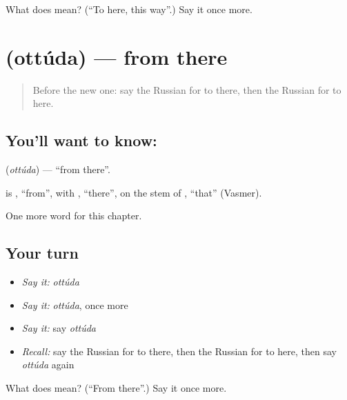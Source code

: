 \begin{tcolorbox}[breakable,colback=teal!4,colframe=teal!35!black,title={Before you move on}]
What does  mean? (\textquotedblleft{}To here, this way\textquotedblright{}.) Say it once more.
\end{tcolorbox}
\section[\texorpdfstring{\ru{оттуда} (ottúda)}{оттуда (ottúda)}]{ (ottúda) — from there}

\label{lesson:RU-C184-ottuda}



\begin{quote}
Before the new one: say the Russian for to there, then the Russian for to here.
\end{quote}

\subsection*{You'll want to know: }
\textbf{} (\emph{ottúda}) — \textquotedblleft{}from there\textquotedblright{}.

\begin{cousinweb}
\textbf{} is \emph{}, \textquotedblleft{}from\textquotedblright{}, with \emph{}, \textquotedblleft{}there\textquotedblright{}, on the stem of \emph{}, \textquotedblleft{}that\textquotedblright{} (Vasmer).
\end{cousinweb}

\begin{grammarlens}[title={What you've built}]
One more word for this chapter.
\end{grammarlens}

\subsection*{Your turn}
\begin{itemize}
\raggedright
  \item \emph{Say it:} \emph{ottúda}
  \item \emph{Say it:} \emph{ottúda}, once more
  \item \emph{Say it:} say \emph{ottúda}
  \item \emph{Recall:} say the Russian for to there, then the Russian for to here, then say \emph{ottúda} again
\end{itemize}

\begin{tcolorbox}[breakable,colback=teal!4,colframe=teal!35!black,title={Before you move on}]
What does  mean? (\textquotedblleft{}From there\textquotedblright{}.) Say it once more.
\end{tcolorbox}
